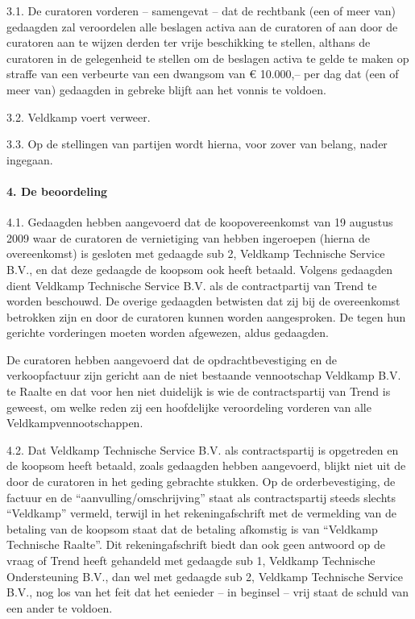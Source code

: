 \documentclass[
  dutch,
  a4paper,
]{article}
\begin{document}
3.1. De curatoren vorderen -- samengevat -- dat de rechtbank (een of meer van) gedaagden zal veroordelen alle beslagen activa aan de curatoren of aan door de curatoren aan te wijzen derden ter vrije beschikking te stellen, althans de curatoren in de gelegenheid te stellen om de beslagen activa te gelde te maken op straffe van een verbeurte van een dwangsom van € 10.000,-- per dag dat (een of meer van) gedaagden in gebreke blijft aan het vonnis te voldoen.

3.2. Veldkamp voert verweer.

3.3. Op de stellingen van partijen wordt hierna, voor zover van belang, nader ingegaan.

\paragraph{4. De beoordeling}\label{de-beoordeling-3}

4.1. Gedaagden hebben aangevoerd dat de koopovereenkomst van 19 augustus 2009 waar de curatoren de vernietiging van hebben ingeroepen (hierna de overeenkomst) is gesloten met gedaagde sub 2, Veldkamp Technische Service B.V., en dat deze gedaagde de koopsom ook heeft betaald. Volgens gedaagden dient Veldkamp Technische Service B.V. als de contractpartij van Trend te worden beschouwd. De overige gedaagden betwisten dat zij bij de overeenkomst betrokken zijn en door de curatoren kunnen worden aangesproken. De tegen hun gerichte vorderingen moeten worden afgewezen, aldus gedaagden.

De curatoren hebben aangevoerd dat de opdrachtbevestiging en de verkoopfactuur zijn gericht aan de niet bestaande vennootschap Veldkamp B.V. te Raalte en dat voor hen niet duidelijk is wie de contractspartij van Trend is geweest, om welke reden zij een hoofdelijke veroordeling vorderen van alle Veldkampvennootschappen.

4.2. Dat Veldkamp Technische Service B.V. als contractspartij is opgetreden en de koopsom heeft betaald, zoals gedaagden hebben aangevoerd, blijkt niet uit de door de curatoren in het geding gebrachte stukken. Op de orderbevestiging, de factuur en de ``aanvulling/omschrijving'' staat als contractspartij steeds slechts ``Veldkamp'' vermeld, terwijl in het rekeningafschrift met de vermelding van de betaling van de koopsom staat dat de betaling afkomstig is van ``Veldkamp Technische Raalte''. Dit rekeningafschrift biedt dan ook geen antwoord op de vraag of Trend heeft gehandeld met gedaagde sub 1, Veldkamp Technische Ondersteuning B.V., dan wel met gedaagde sub 2, Veldkamp Technische Service B.V., nog los van het feit dat het eenieder -- in beginsel -- vrij staat de schuld van een ander te voldoen.
\end{document}
